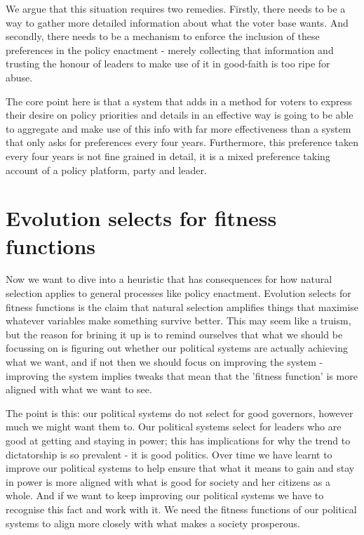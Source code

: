 \documentclass[twoside]{article}
\theoremstyle{definition}
\begin{document}
We argue that this situation requires two remedies. Firstly, there needs to be a way to gather more detailed information about what the voter base wants. And secondly, there needs to be a mechanism to enforce the inclusion of these preferences in the policy enactment - merely collecting that information and trusting the honour of leaders to make use of it in good-faith is too ripe for abuse.

The core point here is that a system that adds in a method for voters to express their desire on policy priorities and details in an effective way is going to be able to aggregate and make use of this info with far more effectiveness than a system that only asks for preferences every four years. Furthermore, this preference taken every four years is not fine grained in detail, it is a mixed preference taking account of a policy platform, party and leader.

\section{Evolution selects for fitness functions}

Now we want to dive into a heuristic that has consequences for how natural selection applies to general processes like policy enactment. Evolution selects for fitness functions is the claim that natural selection amplifies things that maximise whatever variables make something survive better. This may seem like a truism, but the reason for brining it up is to remind ourselves that what we should be focussing on is figuring out whether our political systems are actually achieving what we want, and if not then we should focus on improving the system - improving the system implies tweaks that mean that the 'fitness function' is more aligned with what we want to see.

The point is this: our political systems do not select for good governors, however much we might want them to. Our political systems select for leaders who are good at getting and staying in power; this has implications for why the trend to dictatorship is so prevalent - it is good politics. Over time we have learnt to improve our political systems to help ensure that what it means to gain and stay in power is more aligned with what is good for society and her citizens as a whole. And if we want to keep improving our political systems we have to recognise this fact and work with it. We need the fitness functions of our political systems to align more closely with what makes a society prosperous.
\end{document}
